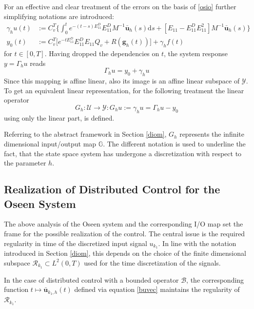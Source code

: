 \documentclass[a4paper,10pt,BCOR=15mm]{scrbook}
\providecommand{\inva}[1]{\text{d} #1}
\begin{document}
For an effective and clear treatment of the errors on the basis of \eqref{osio} further simplifying notations are introduced:
\begin{align}\label{iogam}
\gamma_h u (t) &:= C_v^T \Big \lbrace \int_0^t e^{-(t-s) E_{11}^D}E_{11}^D M^{-1}\bar {\mathbf u}_h(s) \inva{s}+[E_{11} - E_{11}^DE_{11}^2]M^{-1}\bar {\mathbf u}_h(s)\Big \rbrace \\
  y_{0}(t) &:= C_v^T  \bigl[ e^{-t E_{11}^D}E_{11}^DE_{11}Q_v  + R( \mathbf g_h(t))\bigr ]+ \gamma_h f(t)
\end{align}
for $t\in [0,T]$. Having dropped the dependencies on $t$, the system response $y = \Gamma_h u$ reads
\begin{equation*}
 \Gamma_h u = y_{0} +\gamma_h u
\end{equation*}
Since this mapping is affine linear, also its image is an affine linear subspace of $\mathcal Y$. To get an equivalent linear representation, for the following treatment the linear operator
\begin{equation}\label{ioms}
G_h:\mathcal U  \rightarrow \mathcal Y :  G_h  u :=  \gamma_h u = \Gamma_h  u -  y_{0} 
\end{equation}
using only the linear part, is defined. 
\begin{rem}
 Referring to the abstract framework in Section \ref{diom}, $G_h$ represents the infinite dimensional input/output map $\mathbb G$. The different notation is used to underline the fact, that the state space system has undergone a discretization with respect to the parameter $h$. 
\end{rem}

\subsection{Realization of Distributed Control for the Oseen System}\label{rdco}
The above analysis of the Oseen system and the corresponding I/O map set the frame for the possible realization of the control. The central issue is the required regularity in time of the discretized input signal $u_{k_1}$. In line with the notation introduced in Section \ref{diom}, this depends on the choice of the finite dimensional subspace $\mathcal R_{k_1} \subset L^2(0,T)$ used for the time discretization of the signals.

In the case of distributed control with a bounded operator $\mathcal B$, the corresponding function $t \mapsto \bar {\mathbf u}_{k_1,h}(t)$ defined via equation \eqref{buvec} maintains the regularity of $\mathcal R_{k_1}$. 
\end{document}
